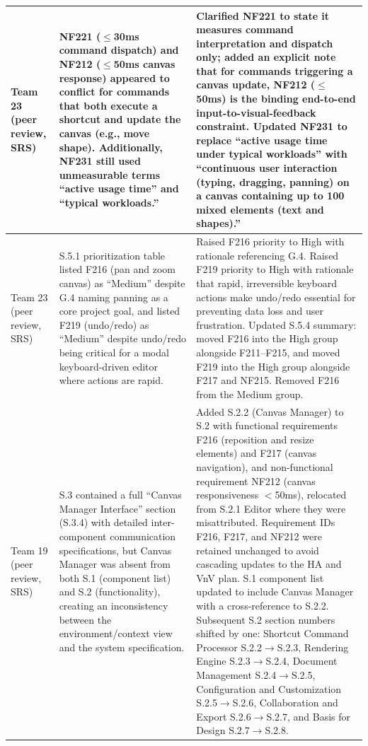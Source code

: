 \documentclass{article}
\begin{document}
\begin{tabularx}{\textwidth}{>{\hsize=0.4\hsize}X >{\hsize=0.8\hsize}X >{\hsize=1.8\hsize}X}
\midrule
Team 23 (peer review, SRS) &
  NF221 ($\leq$30ms command dispatch) and NF212 ($\leq$50ms canvas response) appeared to conflict for commands that both execute a shortcut and update the canvas (e.g., move shape). Additionally, NF231 still used unmeasurable terms ``active usage time'' and ``typical workloads.'' &
  Clarified NF221 to state it measures command interpretation and dispatch only; added an explicit note that for commands triggering a canvas update, NF212 ($\leq$50ms) is the binding end-to-end input-to-visual-feedback constraint. Updated NF231 to replace ``active usage time under typical workloads'' with ``continuous user interaction (typing, dragging, panning) on a canvas containing up to 100 mixed elements (text and shapes).'' \\
\midrule
Team 23 (peer review, SRS) &
  S.5.1 prioritization table listed F216 (pan and zoom canvas) as ``Medium'' despite G.4 naming panning as a core project goal, and listed F219 (undo/redo) as ``Medium'' despite undo/redo being critical for a modal keyboard-driven editor where actions are rapid. &
  Raised F216 priority to High with rationale referencing G.4. Raised F219 priority to High with rationale that rapid, irreversible keyboard actions make undo/redo essential for preventing data loss and user frustration. Updated S.5.4 summary: moved F216 into the High group alongside F211--F215, and moved F219 into the High group alongside F217 and NF215. Removed F216 from the Medium group. \\
\midrule
Team 19 (peer review, SRS) &
  S.3 contained a full ``Canvas Manager Interface'' section (S.3.4) with detailed inter-component communication specifications, but Canvas Manager was absent from both S.1 (component list) and S.2 (functionality), creating an inconsistency between the environment/context view and the system specification. &
  Added S.2.2 (Canvas Manager) to S.2 with functional requirements F216 (reposition and resize elements) and F217 (canvas navigation), and non-functional requirement NF212 (canvas responsiveness $<$50ms), relocated from S.2.1 Editor where they were misattributed. Requirement IDs F216, F217, and NF212 were retained unchanged to avoid cascading updates to the HA and VnV plan. S.1 component list updated to include Canvas Manager with a cross-reference to S.2.2. Subsequent S.2 section numbers shifted by one: Shortcut Command Processor S.2.2$\to$S.2.3, Rendering Engine S.2.3$\to$S.2.4, Document Management S.2.4$\to$S.2.5, Configuration and Customization S.2.5$\to$S.2.6, Collaboration and Export S.2.6$\to$S.2.7, and Basis for Design S.2.7$\to$S.2.8. \\
\end{tabularx}
\end{document}
